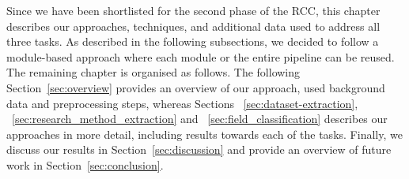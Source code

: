 Since we have been shortlisted for the second phase of the RCC, this chapter describes our approaches, techniques, and additional data used to address all three tasks. As described in the following subsections, we decided to follow a module-based approach where each module or the entire pipeline can be reused. The remaining chapter is organised as follows.
The following Section~\ref{sec:overview} provides an overview of our approach, used background data and preprocessing steps, whereas Sections ~\ref{sec:dataset-extraction}, ~\ref{sec:research_method_extraction} and ~\ref{sec:field_classification} describes our approaches in more detail, including results towards each of the tasks. Finally, we discuss our results in Section~\ref{sec:discussion} and provide an overview of future work in Section~\ref{sec:conclusion}.



